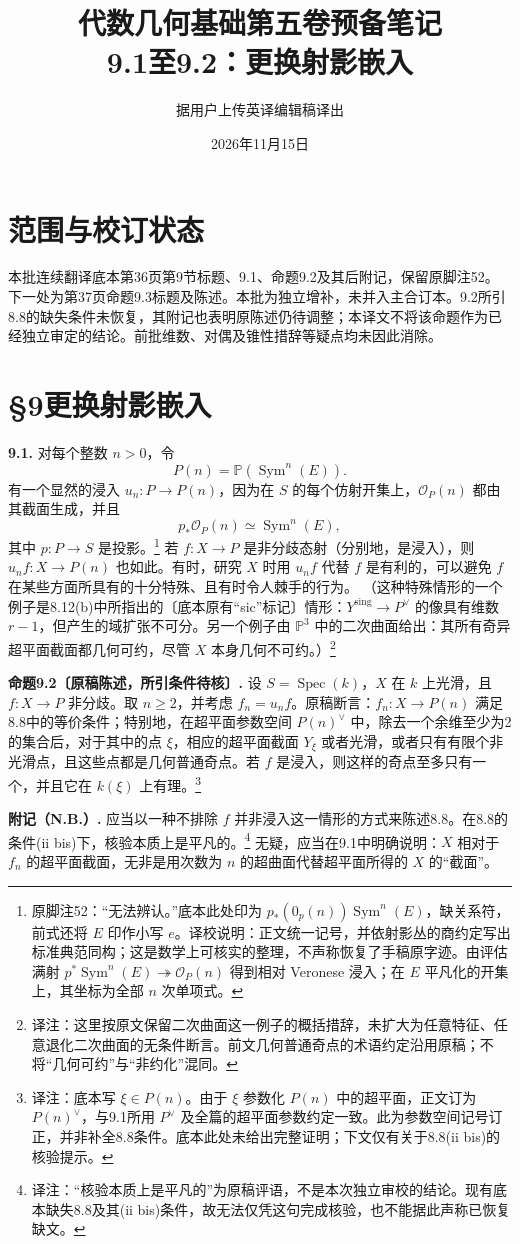 \documentclass[openany]{ctexbook}
\title{代数几何基础第五卷预备笔记\\9.1至9.2：更换射影嵌入}
\author{据用户上传英译编辑稿译出}
\date{2026年11月15日}
\newcommand{\note}[1]{\footnote{译注：#1}}
\begin{document}
\maketitle
\chapter*{范围与校订状态}
本批连续翻译底本第36页第9节标题、9.1、命题9.2及其后附记，保留原脚注52。下一处为第37页命题9.3标题及陈述。本批为独立增补，未并入主合订本。9.2所引8.8的缺失条件未恢复，其附记也表明原陈述仍待调整；本译文不将该命题作为已经独立审定的结论。前批维数、对偶及锥性措辞等疑点均未因此消除。
\chapter*{§9\quad 更换射影嵌入}
\noindent\textbf{9.1.}
对每个整数 $n>0$，令
\[
P(n)=\mathbb P(\operatorname{Sym}^{n}(E)).
\]
有一个显然的浸入 $u_n:P\to P(n)$，因为在 $S$ 的每个仿射开集上，$\mathcal O_P(n)$ 都由其截面生成，并且
\[
p_*\mathcal O_P(n)\simeq\operatorname{Sym}^{n}(E),
\]
其中 $p:P\to S$ 是投影。\footnote{原脚注52：“无法辨认。”底本此处印为 $p_*(0_p(n))\operatorname{Sym}^{n}(E)$，缺关系符，前式还将 $E$ 印作小写 $e$。译校说明：正文统一记号，并依射影丛的商约定写出标准典范同构；这是数学上可核实的整理，不声称恢复了手稿原字迹。由评估满射 $p^*\operatorname{Sym}^{n}(E)\twoheadrightarrow\mathcal O_P(n)$ 得到相对 Veronese 浸入；在 $E$ 平凡化的开集上，其坐标为全部 $n$ 次单项式。}
若 $f:X\to P$ 是非分歧态射（分别地，是浸入），则 $u_n f:X\to P(n)$ 也如此。有时，研究 $X$ 时用 $u_n f$ 代替 $f$ 是有利的，可以避免 $f$ 在某些方面所具有的十分特殊、且有时令人棘手的行为。
（这种特殊情形的一个例子是8.12(b)中所指出的〔底本原有“sic”标记〕情形：$Y^{\mathrm{sing}}\to P^\vee$ 的像具有维数 $r-1$，但产生的域扩张不可分。另一个例子由 $\mathbb P^3$ 中的二次曲面给出：其所有奇异超平面截面都几何可约，尽管 $X$ 本身几何不可约。）\note{这里按原文保留二次曲面这一例子的概括措辞，未扩大为任意特征、任意退化二次曲面的无条件断言。前文几何普通奇点的术语约定沿用原稿；不将“几何可约”与“非约化”混同。}

\medskip
\noindent\textbf{命题9.2〔原稿陈述，所引条件待核〕.}
设 $S=\operatorname{Spec}(k)$，$X$ 在 $k$ 上光滑，且 $f:X\to P$ 非分歧。取 $n\ge2$，并考虑 $f_n=u_n f$。原稿断言：$f_n:X\to P(n)$ 满足8.8中的等价条件；特别地，在超平面参数空间 $P(n)^\vee$ 中，除去一个余维至少为2的集合后，对于其中的点 $\xi$，相应的超平面截面 $Y_\xi$ 或者光滑，或者只有有限个非光滑点，且这些点都是几何普通奇点。若 $f$ 是浸入，则这样的奇点至多只有一个，并且它在 $k(\xi)$ 上有理。\note{底本写 $\xi\in P(n)$。由于 $\xi$ 参数化 $P(n)$ 中的超平面，正文订为 $P(n)^\vee$，与9.1所用 $P^\vee$ 及全篇的超平面参数约定一致。此为参数空间记号订正，并非补全8.8条件。底本此处未给出完整证明；下文仅有关于8.8(ii bis)的核验提示。}

\medskip
\noindent\textbf{附记（N.B.）.}
应当以一种不排除 $f$ 并非浸入这一情形的方式来陈述8.8。在8.8的条件(ii bis)下，核验本质上是平凡的。\note{“核验本质上是平凡的”为原稿评语，不是本次独立审校的结论。现有底本缺失8.8及其(ii bis)条件，故无法仅凭这句完成核验，也不能据此声称已恢复缺文。}
无疑，应当在9.1中明确说明：$X$ 相对于 $f_n$ 的超平面截面，无非是用次数为 $n$ 的超曲面代替超平面所得的 $X$ 的“截面”。
\end{document}
